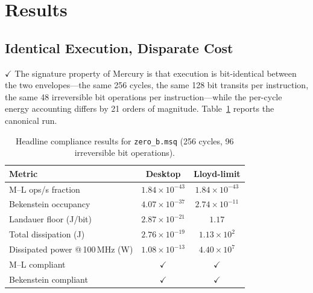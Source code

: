 \documentclass[conference,letterpaper,10pt]{IEEEtran}
\newcommand{\Verified}{\textbf{\textcolor[rgb]{0.0,0.5,0.0}{$\checkmark$}}}
\newcommand{\code}[1]{\texttt{\small #1}}
\begin{document}
\section{Results}

\subsection{Identical Execution, Disparate Cost}

\Verified{} The signature property of Mercury is that execution
is bit-identical between the two envelopes---the same 256 cycles,
the same 128 bit transits per instruction, the same 48 irreversible
bit operations per instruction---while the per-cycle energy
accounting differs by 21 orders of magnitude.
Table~\ref{tab:headline} reports the canonical run.

\begin{table}[t]
\centering
\caption{Headline compliance results for \code{zero\_b.msq}
(256 cycles, 96 irreversible bit operations).}
\label{tab:headline}
\renewcommand{\arraystretch}{1.25}
\begin{tabular}{lcc}
\toprule
\textbf{Metric}                                        & \textbf{Desktop}         & \textbf{Lloyd-limit}     \\
\midrule
M--L ops/s fraction                                    & $1.84\times10^{-43}$     & $1.84\times10^{-43}$     \\
Bekenstein occupancy                                   & $4.07\times10^{-37}$     & $2.74\times10^{-11}$     \\
Landauer floor (J/bit)                                 & $2.87\times10^{-21}$     & $1.17$                   \\
Total dissipation (J)                                  & $2.76\times10^{-19}$     & $1.13\times10^{2}$       \\
Dissipated power @\,100\,MHz (W)                       & $1.08\times10^{-13}$     & $4.40\times10^{7}$       \\
M--L compliant                                         & \Verified{}              & \Verified{}              \\
Bekenstein compliant                                   & \Verified{}              & \Verified{}              \\
\bottomrule
\end{tabular}
\end{table}
\end{document}
